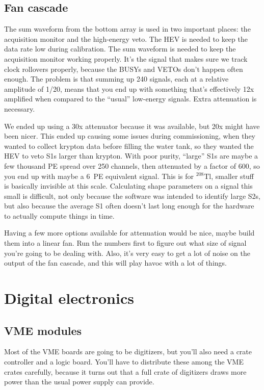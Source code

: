 \subsection{Fan cascade}

The sum waveform from the bottom array is used in two important places: the acquisition monitor and the high-energy veto.
The HEV is needed to keep the data rate low during calibration.
The sum waveform is needed to keep the acquisition monitor working properly.
It's the signal that makes sure we track clock rollovers properly, because the BUSYs and VETOs don't happen often enough.
The problem is that summing up 240 signals, each at a relative amplitude of 1/20, means that you end up with something that's effectively 12x amplified when compared to the ``usual'' low-energy signals.
Extra attenuation is necessary.

We ended up using a 30x attenuator because it was available, but 20x might have been nicer.
This ended up causing some issues during commissioning, when they wanted to collect krypton data before filling the water tank, so they wanted the HEV to veto S1s larger than krypton.
With poor purity, ``large'' S1s are maybe a few thousand PE spread over 250 channels, then attenuated by a factor of 600, so you end up with maybe a 6~PE equivalent signal.
This is for $^{208}\mathrm{Tl}$, smaller stuff is basically invisible at this scale.
Calculating shape parameters on a signal this small is difficult, not only because the software was intended to identify large S2s, but also because the average S1 often doesn't last long enough for the hardware to actually compute things in time.

Having a few more options available for attenuation would be nice, maybe build them into a linear fan.
Run the numbers first to figure out what size of signal you're going to be dealing with.
Also, it's very easy to get a lot of noise on the output of the fan cascade, and this will play havoc with a lot of things.

\section{Digital electronics}

\subsection{VME modules}

Most of the VME boards are going to be digitizers, but you'll also need a crate controller and a logic board.
You'll have to distribute these among the VME crates carefully, because it turns out that a full crate of digitizers draws more power than the usual power supply can provide.

